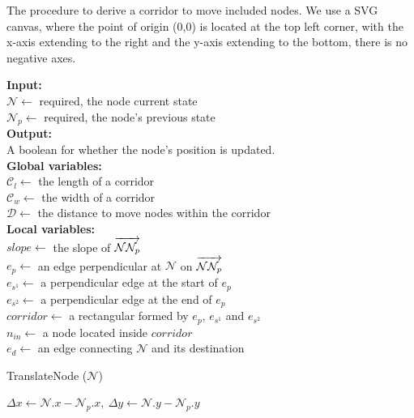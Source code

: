 \begin{algorithm}[tb!]
    \caption{The procedure to derive a corridor to move included nodes. We use a SVG canvas, where the point of origin (0,0) is located at the top left corner, with the x-axis extending to the right and the y-axis extending to the bottom, there is no negative axes.}\label{alg:derive corridor}

    \textbf{Input:} \\
    $ \mathcal{N} \gets $ required, the node current state \\
    $ \mathcal{N}_{p} \gets $ required, the node's previous state \\

    \textbf{Output:} \\
    A boolean for whether the node's position is updated. \\

    \textbf{Global variables:} \\
    $ \mathcal{C}_l \gets $ the length of a corridor \\
    $ \mathcal{C}_w \gets $ the width of a corridor \\
    $ \mathcal{D} \gets $ the distance to move nodes within the corridor \\

    \textbf{Local variables:} \\
    $ slope \gets $ the slope of $ \overrightarrow{\mathcal{N}\mathcal{N}_{p}\strut} $ \\
    $ e_{p} \gets $ an edge perpendicular at $ \mathcal{N} $ on $ \overrightarrow{\mathcal{N}\mathcal{N}_{p}\strut} $ \\
    $ e_{s^1} \gets $ a perpendicular edge at the start of $ e_{p} $ \\
    $ e_{s^2} \gets $ a perpendicular edge at the end of $ e_{p} $ \\
    $ corridor \gets $ a rectangular formed by $ e_p $, $ e_{s^1} $ and $ e_{s^2} $ \\
    $ n_{in} \gets $ a node located inside $ corridor $ \\
    $ e_{d} \gets $ an edge connecting $ \mathcal{N} $ and its destination \\

    \begin{algorithmic}[1]
            \State TranslateNode ($ \mathcal{N} $)

            \State $ \Delta x \gets \mathcal{N}.x - \mathcal{N}_{p}.x,~ \Delta y \gets \mathcal{N}.y - \mathcal{N}_{p}.y $


\end{algorithmic}
\end{algorithm}
